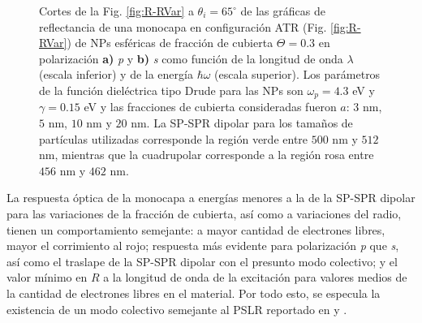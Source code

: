 \begin{figure}[h!]
	\caption{Cortes de la Fig. \ref{fig:R-RVar} a $\theta_i = 65^\circ$ de las gráficas de reflectancia de una monocapa en configuración ATR (Fig. \ref{fig:R-RVar}) de NPs esféricas de fracción de cubierta $\Theta = 0.3$ en polarización \textbf{a)} \emph{p} y \textbf{b)} \emph{s} como función de la longitud de onda $\lambda$ (escala inferior) y de la energía $\hbar\omega$ (escala superior). Los parámetros de la función dieléctrica tipo Drude para las NPs son $\omega_p = 4.3$ eV y $\gamma = 0.15$ eV y las fracciones de cubierta consideradas fueron $a$: $3$ nm, $5$ nm, $10$ nm y $20$ nm. La SP-SPR dipolar para los tamaños de partículas utilizadas corresponde la región verde entre $500$ nm y $512$ nm, mientras que la cuadrupolar corresponde a la región rosa entre $456$ nm y $462$ nm.}\label{fig:R-RVar-Cuts}
	\end{figure}	

La respuesta óptica de la monocapa a energías menores a la de la SP-SPR dipolar para las variaciones de la fracción de cubierta, así como a variaciones del radio, tienen un comportamiento semejante: a mayor cantidad de electrones libres, mayor el corrimiento al rojo; respuesta más evidente para polarización \emph{p} que \emph{s}, así como el traslape  de la SP-SPR dipolar con el presunto modo colectivo; y el valor mínimo en $R$ a la longitud de onda de la excitación para valores medios de la cantidad de electrones libres en el material. Por todo esto, se especula la existencia de un modo colectivo semejante al PSLR reportado en  \cite{kabashin2009plasmonic} y \cite{danilov2018ultra}. 

